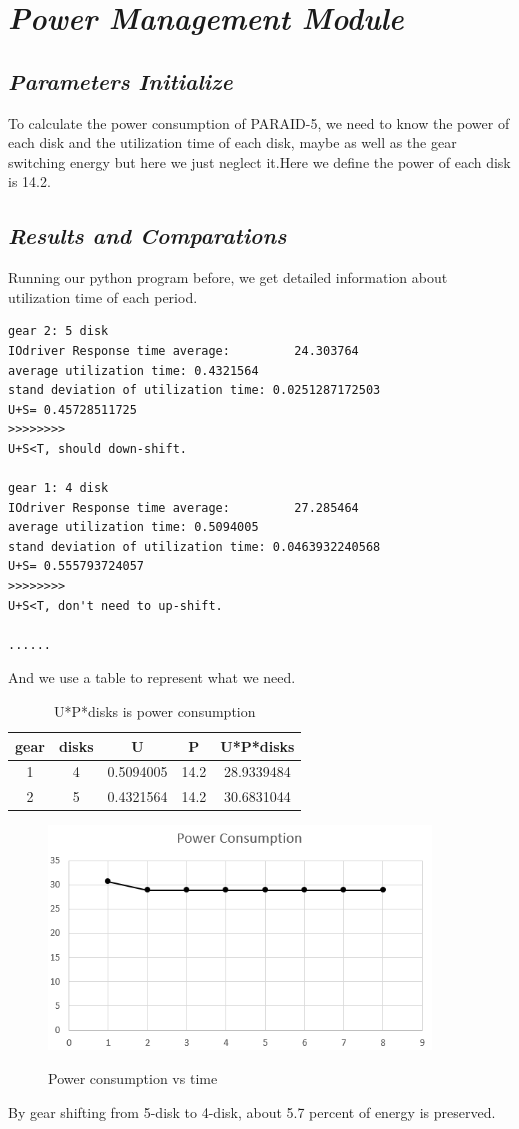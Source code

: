 \documentclass[conference]{IEEEtran}
\begin{document}
\section{\emph{\textbf{Power Management Module}}}
\subsection{\emph{\textbf{Parameters Initialize}}}
To calculate the power consumption of PARAID-5, we need to know the power of each disk and the utilization time of each disk, maybe as well as the gear switching energy but here we just neglect it.Here we define the power of each disk is 14.2.\\
\subsection{\emph{\textbf{Results and Comparations}}}
Running our python program before, we get detailed information about utilization time of each period.\\
\begin{lstlisting}
gear 2: 5 disk
IOdriver Response time average:         24.303764
average utilization time: 0.4321564
stand deviation of utilization time: 0.0251287172503
U+S= 0.45728511725
>>>>>>>>
U+S<T, should down-shift.

gear 1: 4 disk
IOdriver Response time average:         27.285464
average utilization time: 0.5094005
stand deviation of utilization time: 0.0463932240568
U+S= 0.555793724057
>>>>>>>>
U+S<T, don't need to up-shift.

......

\end{lstlisting}
And we use a table to represent what we need.
\begin{table}[H]
\centering
\begin{tabular}{ccccc}
\hline
gear		&disks		&U			&P 					&U*P*disks			\\ \hline
1			&4			&0.5094005	&14.2 	&28.9339484	\\ \hline
2			&5			&0.4321564	&14.2 	&30.6831044	\\ \hline
\end{tabular}
\caption{U*P*disks is power consumption}
\end{table}
\begin{figure}[H]
  \centering
  \includegraphics[width=4in]{result2.png}\\
  \caption{Power consumption vs time}\label{figure3}
\end{figure}
By gear shifting from 5-disk to 4-disk, about 5.7 percent of energy is preserved.
\end{document}
